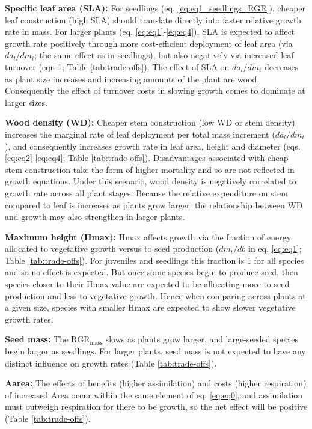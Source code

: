\documentclass[a4paper]{article}\usepackage[]{graphicx}\usepackage[]{color}
\begin{document}
\textbf{Specific leaf area (SLA):} For seedlings (eq. \ref{eq:eq1_seedlings_RGR}), cheaper leaf construction (high SLA) should translate directly into faster relative growth rate in mass. For larger plants (eq. \ref{eq:eq1}-\ref{eq:eq4}), SLA is expected to affect growth rate positively through more cost-efficient deployment of leaf area (via $da_l/dm_t$; the same effect as in seedlings), but also negatively via increased leaf turnover (eqn 1; Table \ref{tab:trade-offs}). The effect of SLA on $da_l/dm_t$ decreases as plant size increases and increasing amounts of the plant are wood. Consequently the effect of turnover costs in slowing growth comes to dominate at larger sizes. 

\textbf{Wood density (WD):} Cheaper stem construction (low WD or stem density) increases the marginal rate of leaf deployment per total mass increment ($da_l/dm_t$), and consequently increases growth rate in leaf area, height and diameter (eqs. \ref{eq:eq2}-\ref{eq:eq4}; Table \ref{tab:trade-offs}). Disadvantages associated with cheap stem construction take the form of higher mortality and so are not reflected in growth equations. Under this scenario, wood density is negatively correlated to growth rate across all plant stages. Because the relative expenditure on stem compared to leaf is increases as plants grow larger, the relationship between WD and growth may also strengthen in larger plants. 

\textbf{Maximum height (Hmax):} Hmax affects growth via the fraction of energy allocated to vegetative growth versus to seed production ($dm_t/db$ in eq. \ref{eq:eq1}; Table \ref{tab:trade-offs}). For juveniles and seedlings this fraction is 1 for all species and so no effect is expected. But once some species begin to produce seed, then species closer to their Hmax value are expected to be allocating more to seed production and less to vegetative growth. Hence when comparing across plants at a given size, species with smaller Hmax are expected to show slower vegetative growth rates.

\textbf{Seed mass:} The $\textrm{RGR}_{\textrm{mass}}$ slows as plants grow larger, and large-seeded species begin larger as seedlings. For larger plants, seed mass is not expected to have any distinct influence on growth rates  (Table \ref{tab:trade-offs}).

\textbf{Aarea:} The effects of benefits (higher assimilation) and costs (higher respiration) of increased Area occur within the same element of eq. \ref{eq:eq0}, and assimilation must outweigh respiration for there to be growth, so the net effect will be positive (Table \ref{tab:trade-offs}).   
\end{document}
